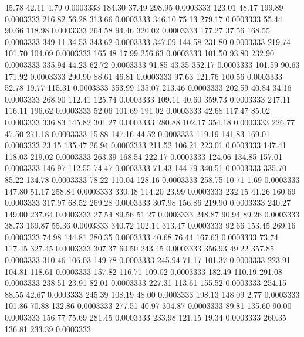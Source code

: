   45.78   42.11    4.79   0.0003333
 184.30   37.49  298.95   0.0003333
 123.01   48.17  199.89   0.0003333
 216.82   56.28  313.66   0.0003333
 346.10   75.13  279.17   0.0003333
  55.44   90.66  118.98   0.0003333
 264.58   94.46  320.02   0.0003333
 177.27   37.56  168.55   0.0003333
 349.11   34.53  343.62   0.0003333
 347.09  144.58  231.80   0.0003333
 219.74  101.70  104.09   0.0003333
 165.48   17.99  256.63   0.0003333
 101.50   93.80  232.90   0.0003333
 335.94   44.23   62.72   0.0003333
  91.85   43.35  352.17   0.0003333
 101.59   90.63  171.92   0.0003333
 290.90   88.61   46.81   0.0003333
  97.63  121.76  100.56   0.0003333
  52.78   19.77  115.31   0.0003333
 353.99  135.07  213.46   0.0003333
 202.59   40.84   34.16   0.0003333
 268.90  112.41  125.74   0.0003333
 109.11   40.60  359.73   0.0003333
 247.11  116.11  196.62   0.0003333
  52.06  101.69  191.02   0.0003333
  42.68  117.47   85.02   0.0003333
 336.83  145.82  301.27   0.0003333
 280.88  102.17  354.18   0.0003333
 226.77   47.50  271.18   0.0003333
  15.88  147.16   44.52   0.0003333
 119.19  141.83  169.01   0.0003333
  23.15  135.47   26.94   0.0003333
 211.52  106.21  223.01   0.0003333
 147.41  118.03  219.02   0.0003333
 263.39  168.54  222.17   0.0003333
 124.06  134.85  157.01   0.0003333
 146.97  112.55   74.47   0.0003333
  71.43  144.79  340.51   0.0003333
 335.70   85.22  134.78   0.0003333
  78.22  110.04  128.16   0.0003333
 258.75   10.71    1.69   0.0003333
 147.80   51.17  258.84   0.0003333
 330.48  114.20   23.99   0.0003333
 232.15   41.26  160.69   0.0003333
 317.97   68.52  269.28   0.0003333
 307.98  156.86  219.90   0.0003333
 240.27  149.00  237.64   0.0003333
  27.54   89.56   51.27   0.0003333
 248.87   90.94   89.26   0.0003333
  38.73  169.87   55.36   0.0003333
 340.72  102.14  313.47   0.0003333
  92.66  153.45  269.16   0.0003333
  74.98  144.81  280.35   0.0003333
  40.68   76.44  167.63   0.0003333
  73.74  117.45  327.45   0.0003333
 307.37   60.50  243.45   0.0003333
 356.93   49.22  357.85   0.0003333
 310.46  106.03  149.78   0.0003333
 245.94   71.17  101.37   0.0003333
 223.91  104.81  118.61   0.0003333
 157.82  116.71  109.02   0.0003333
 182.49  110.19  291.08   0.0003333
 238.51   23.91   82.01   0.0003333
 227.31  113.61  155.52   0.0003333
 254.15   88.55   42.67   0.0003333
 245.39  108.19   48.00   0.0003333
 198.13  148.09    2.77   0.0003333
 101.86   70.88  132.86   0.0003333
 277.51   40.97  304.87   0.0003333
  89.81  135.60   90.00   0.0003333
 156.77   75.69  281.45   0.0003333
 233.98  121.15   19.34   0.0003333
 260.35  136.81  233.39   0.0003333
